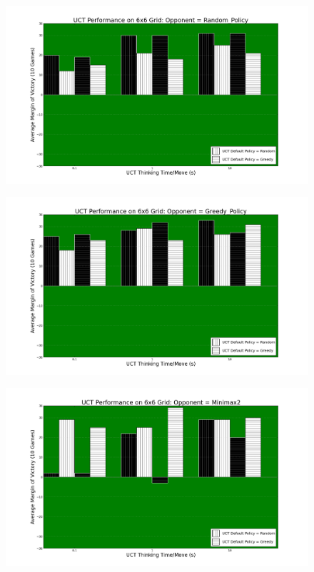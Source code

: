 \documentclass[12pt,letterpaper]{article}
\begin{document}
\begin{figure}[!hp]
\begin{center}
\includegraphics[scale=.4]{66_Random_Policy}
\end{center}
\end{figure}

\begin{figure}[!hp]
\begin{center}
\includegraphics[scale=.4]{66_Greedy_Policy}
\end{center}
\end{figure}

\begin{figure}[!hp]
\begin{center}
\includegraphics[scale=.4]{66_Minimax2}
\end{center}
\end{figure}
\end{document}
